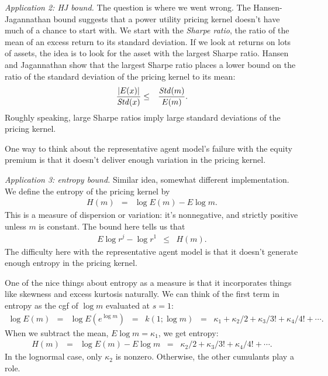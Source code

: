 \documentclass[11pt]{article}
\begin{document}
{\it Application 2: HJ bound.\/}
The question is where we went wrong.
The Hansen-Jagannathan bound suggests that a power utility pricing kernel
doesn't have much of a chance to start with.
We start with the {\it Sharpe ratio\/}, the ratio of the mean of an excess return
to its standard deviation.
If we look at returns on lots of assets, the idea is to look for the asset
with the largest Sharpe ratio.
Hansen and Jagannathan show that the largest Sharpe ratio places a lower bound on
the ratio of the standard deviation of the pricing kernel to its mean:
\begin{eqnarray*}
  \frac{| E(x)|}{ \mbox{\it Std\/}(x)} &\leq& \frac{ \mbox{\it Std\/}(m)}{E(m)} .
\end{eqnarray*}
Roughly speaking, large Sharpe ratios imply large standard deviations of the pricing kernel.

One way to think about the representative agent model's failure with the equity premium
is that it doesn't deliver enough variation in the pricing kernel.


{\it Application 3: entropy bound.\/}
Similar idea, somewhat different implementation.
We define the entropy of the pricing kernel by
\begin{eqnarray*}
    H(m) &=& \log E(m) - E \log m .
\end{eqnarray*}
This is a measure of dispersion or variation:
it's nonnegative, and strictly positive unless $m$ is constant.
The bound here tells us that
\begin{eqnarray*}
    E  \log r^j - \log r^1  &\leq&  H(m) .
\end{eqnarray*}
The difficulty here with the representative agent model is
that it doesn't generate enough entropy in the pricing kernel.

One of the nice things about entropy as a measure is that it incorporates
things like skewness and excess kurtosis naturally.
We can think of the first term in entropy as the cgf of $\log m$
evaluated at $s=1$:
\begin{eqnarray*}
   \log E(m) &=& \log E \left( e^{\log m}\right)
        \;\;=\;\; k(1; \log m)
        \;\;=\;\; \kappa_1 + \kappa_2/ 2 + \kappa_3/3! + \kappa_4/4! + \cdots .
\end{eqnarray*}
When we subtract the mean, $E \log m = \kappa_1$, we get entropy:
\begin{eqnarray*}
   H(m)  &=& \log E(m) - E \log m
        \;\;=\;\; \kappa_2/ 2 + \kappa_3/3! + \kappa_4/4! + \cdots .
\end{eqnarray*}
In the lognormal case, only $\kappa_2$ is nonzero.
Otherwise, the other cumulants play a role.
\end{document}
